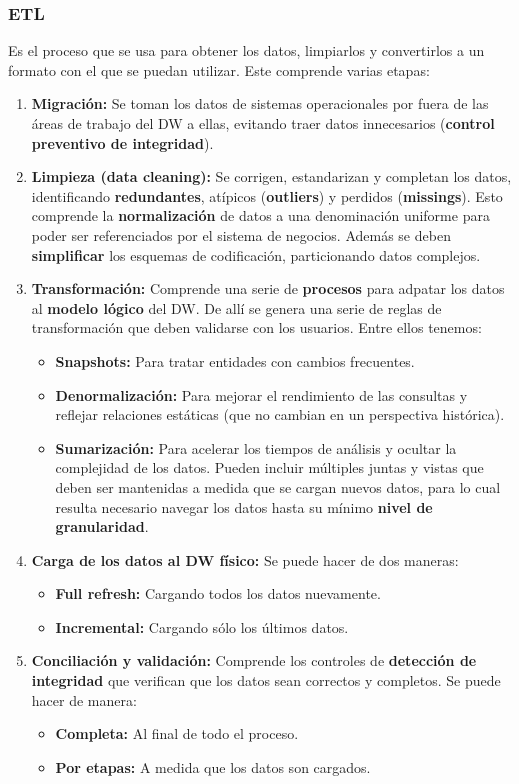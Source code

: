 \subsubsection*{ETL}
Es el proceso que se usa para obtener los datos, limpiarlos y convertirlos a un formato con el que se puedan utilizar. Este comprende varias etapas:
\begin{enumerate}
    \item \textbf{Migración:} Se toman los datos de sistemas operacionales por fuera de las áreas de trabajo del DW a ellas, evitando traer datos innecesarios (\textbf{control preventivo de integridad}).
    \item \textbf{Limpieza (data cleaning):} Se corrigen, estandarizan y completan los datos, identificando \textbf{redundantes}, atípicos (\textbf{outliers}) y perdidos (\textbf{missings}). Esto comprende la \textbf{normalización} de datos a una denominación uniforme para poder ser referenciados por el sistema de negocios. Además se deben \textbf{simplificar} los esquemas de codificación, particionando datos complejos.
    \item \textbf{Transformación:} Comprende una serie de \textbf{procesos} para adpatar los datos al \textbf{modelo lógico} del DW. De allí se genera una serie de reglas de transformación que deben validarse con los usuarios. Entre ellos tenemos:
    \begin{itemize}
        \item \textbf{Snapshots:} Para tratar entidades con cambios frecuentes.
        \item \textbf{Denormalización:} Para mejorar el rendimiento de las consultas y reflejar relaciones estáticas (que no cambian en un perspectiva histórica).
        \item \textbf{Sumarización:} Para acelerar los tiempos de análisis y ocultar la complejidad de los datos. Pueden incluir múltiples juntas y vistas que deben ser mantenidas a medida que se cargan nuevos datos, para lo cual resulta necesario navegar los datos hasta su mínimo \textbf{nivel de granularidad}.
    \end{itemize}
    \item \textbf{Carga de los datos al DW físico:} Se puede hacer de dos maneras:
    \begin{itemize}
        \item \textbf{Full refresh:} Cargando todos los datos nuevamente.
        \item \textbf{Incremental:} Cargando sólo los últimos datos.
    \end{itemize}
    \item \textbf{Conciliación y validación:} Comprende los controles de \textbf{detección de integridad} que verifican que los datos sean correctos y completos. Se puede hacer de manera:
    \begin{itemize}
        \item \textbf{Completa:} Al final de todo el proceso.
        \item \textbf{Por etapas:} A medida que los datos son cargados.
    \end{itemize}
\end{enumerate}


